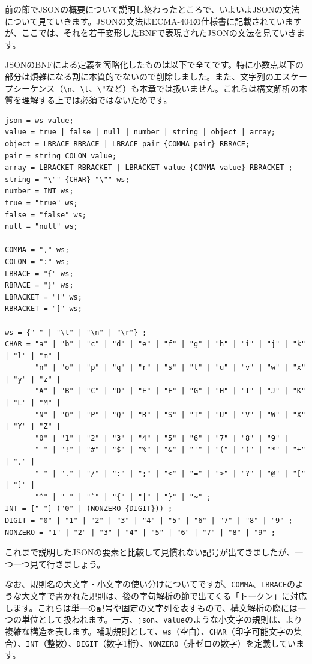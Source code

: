 前の節でJSONの概要について説明し終わったところで、いよいよJSONの文法について見ていきます。JSONの文法はECMA-404の仕様書に記載されていますが、ここでは、それを若干変形したBNFで表現されたJSONの文法を見ていきます。

JSONのBNFによる定義を簡略化したものは以下で全てです。特に小数点以下の部分は煩雑になる割に本質的でないので削除しました。また、文字列のエスケープシーケンス（\texttt{\textbackslash{}n}、\texttt{\textbackslash{}t}、\texttt{\textbackslash{}"}など）も本章では扱いません。これらは構文解析の本質を理解する上では必須ではないためです。

\begin{verbatim}
json = ws value;
value = true | false | null | number | string | object | array;
object = LBRACE RBRACE | LBRACE pair {COMMA pair} RBRACE;
pair = string COLON value;
array = LBRACKET RBRACKET | LBRACKET value {COMMA value} RBRACKET ;
string = "\"" {CHAR} "\"" ws;
number = INT ws;
true = "true" ws;
false = "false" ws;
null = "null" ws;

COMMA = "," ws;
COLON = ":" ws;
LBRACE = "{" ws;
RBRACE = "}" ws;
LBRACKET = "[" ws;
RBRACKET = "]" ws;

ws = {" " | "\t" | "\n" | "\r"} ;
CHAR = "a" | "b" | "c" | "d" | "e" | "f" | "g" | "h" | "i" | "j" | "k" | "l" | "m" |
       "n" | "o" | "p" | "q" | "r" | "s" | "t" | "u" | "v" | "w" | "x" | "y" | "z" |
       "A" | "B" | "C" | "D" | "E" | "F" | "G" | "H" | "I" | "J" | "K" | "L" | "M" |
       "N" | "O" | "P" | "Q" | "R" | "S" | "T" | "U" | "V" | "W" | "X" | "Y" | "Z" |
       "0" | "1" | "2" | "3" | "4" | "5" | "6" | "7" | "8" | "9" |
       " " | "!" | "#" | "$" | "%" | "&" | "'" | "(" | ")" | "*" | "+" | "," |
       "-" | "." | "/" | ":" | ";" | "<" | "=" | ">" | "?" | "@" | "[" | "]" |
       "^" | "_" | "`" | "{" | "|" | "}" | "~" ;
INT = ["-"] ("0" | (NONZERO {DIGIT})) ;
DIGIT = "0" | "1" | "2" | "3" | "4" | "5" | "6" | "7" | "8" | "9" ;
NONZERO = "1" | "2" | "3" | "4" | "5" | "6" | "7" | "8" | "9" ;
\end{verbatim}

これまで説明したJSONの要素と比較して見慣れない記号が出てきましたが、一つ一つ見て行きましょう。

なお、規則名の大文字・小文字の使い分けについてですが、\texttt{COMMA}、\texttt{LBRACE}のような大文字で書かれた規則は、後の字句解析の節で出てくる「トークン」に対応します。これらは単一の記号や固定の文字列を表すもので、構文解析の際には一つの単位として扱われます。一方、\texttt{json}、\texttt{value}のような小文字の規則は、より複雑な構造を表します。補助規則として、\texttt{ws}（空白）、\texttt{CHAR}（印字可能文字の集合）、\texttt{INT}（整数）、\texttt{DIGIT}（数字1桁）、\texttt{NONZERO}（非ゼロの数字）を定義しています。

